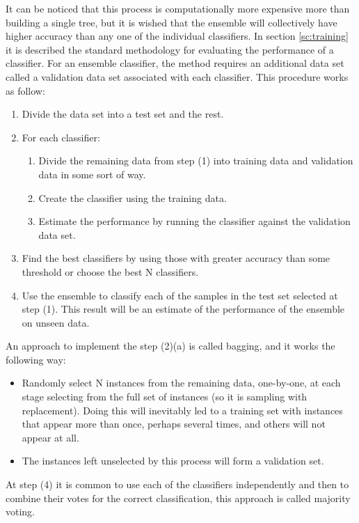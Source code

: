It can be noticed that this process is computationally more expensive more than building a single tree, but it is wished that the ensemble will collectively have higher accuracy than any one of the individual classifiers. In section \ref{sc:training} it is described the standard methodology for evaluating the performance of a classifier. For an ensemble classifier, the method requires an additional data set called a validation data set associated with each classifier. This procedure works as follow:

\begin{enumerate}
    \item Divide the data set into a test set and the rest.
    \item For each classifier:
        \begin{enumerate}
        \item Divide the remaining data from step (1) into training data and validation data in some sort of way.
        \item Create the classifier using the training data.
        \item Estimate the performance by running the classifier against the validation data set.
    \end{enumerate}
    \item Find the best classifiers by using those with greater accuracy than some threshold or choose the best N classifiers.
    \item Use the ensemble to classify each of the samples in the test set selected at step (1). This result will be an estimate of the performance of the ensemble on unseen data.
\end{enumerate}

An approach to implement the step (2)(a) is called bagging, and it works the following way:

\begin{itemize}
    \item Randomly select N instances from the remaining data, one-by-one, at each stage selecting from the full set of instances (so it is sampling with replacement). Doing this will inevitably led to a training set with instances that appear more than once, perhaps several times, and others will not appear at all.
    \item The instances left unselected by this process will form a validation set.
\end{itemize}

At step (4) it is common to use each of the classifiers independently and then to combine their votes for the correct classification, this approach is called majority voting.

